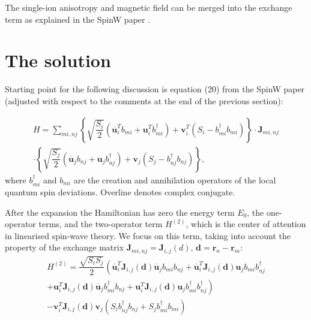 \documentclass[a4paper,12pt]{article}
\begin{document}
        The single-ion anisotropy and magnetic field can be merged into the exchange term as explained in the SpinW paper \cite{toth2015linear}.

    \section{The solution}

        Starting point for the following discussion is equation (20) from the SpinW paper \cite{toth2015linear} 
        (adjusted with respect to the comments at the end of the previous section):

        \begin{multline}
            H = \sum_{mi, nj}\left\{\sqrt{\dfrac{S_{i}}{2}}\left(\overline{\boldsymbol{u}}^T_i b_{mi} + \boldsymbol{u}^T_i b^{\dag}_{mi} \right) + 
            \boldsymbol{v}^T_i(S_i - b^{\dag}_{mi}b_{mi})\right\}  \cdot
            \boldsymbol{J}_{mi, nj}\\
            \cdot\left\{\sqrt{\dfrac{S_{j}}{2}}\left(\overline{\boldsymbol{u}}_j b_{nj} + \boldsymbol{u}_j b^{\dag}_{nj} \right) + 
            \boldsymbol{v}_j(S_j - b^{\dag}_{nj}b_{nj})\right\},
        \end{multline}
        where $b^{\dag}_{mi}$ and $b_{mi}$ are the creation and annihilation operators of the local quantum spin deviations. Overline denotes complex conjugate.

        After the expansion the Hamiltonian has zero the energy term $E_0$, the one-operator terms, 
        and the two-operator term $H^{(2)}$, which is the center of attention in linearised spin-wave theory. 
        We focus on this term, taking into account the property of the exchange matrix $\boldsymbol{J}_{mi, nj} = \boldsymbol{J}_{i,j}(d)$, $\boldsymbol{d} = \boldsymbol{r}_n - \boldsymbol{r}_m$:
        \begin{multline}
            H^{(2)} = \dfrac{\sqrt{S_i S_j}}{2}\left(\overline{\boldsymbol{u}}^T_i\boldsymbol{J}_{i,j}(\boldsymbol{d})\overline{\boldsymbol{u}}_jb_{mi}b_{nj} +
            \overline{\boldsymbol{u}}^T_i\boldsymbol{J}_{i,j}(\boldsymbol{d})\boldsymbol{u}_j b_{mi}b^{\dag}_{nj}\right. \\+ 
            \left.\boldsymbol{u}^T_i\boldsymbol{J}_{i,j}(\boldsymbol{d})\overline{\boldsymbol{u}}_jb^{\dag}_{mi}b_{nj} +
            \boldsymbol{u}^T_i\boldsymbol{J}_{i,j}(\boldsymbol{d})\boldsymbol{u}_jb^{\dag}_{mi}b^{\dag}_{nj}\right) \\-
            \boldsymbol{v}^T_i\boldsymbol{J}_{i,j}(\boldsymbol{d})\boldsymbol{v}_j\left(S_ib^{\dag}_{nj}b_{nj} + S_jb^{\dag}_{mi}b_{mi}\right)
        \end{multline}
\end{document}
